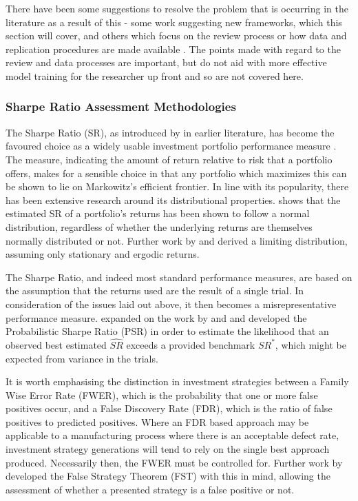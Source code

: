\documentclass[a4paper,11pt,oneside]{article}
\theoremstyle{plain}
\theoremstyle{definition}
\begin{document}
	There have been some suggestions to resolve the problem that is occurring in the literature as a result of this - some 
	work suggesting new frameworks, which this section will cover, and others which focus on the review process or 
	how data and replication procedures are made available \citep{Prado}. The points made with regard to the review and data processes are important, 
	but do not aid with more effective model training for the researcher up front and so are not covered here.
	
	\subsubsection{Sharpe Ratio Assessment Methodologies}\label{lr_backtest_sr}
	
	
	The Sharpe Ratio (SR), as introduced by \citet{Sharpe} in earlier literature, has become the favoured choice as a widely usable
	investment portfolio performance measure \citep{BaileyFrontier}. The measure, indicating the amount of return relative to risk that a portfolio offers, makes for 
	a sensible choice in that any portfolio which maximizes this can be shown to lie on Markowitz's efficient frontier. In line with its popularity, there has been 
	extensive research around its distributional properties. \citet{Lo} shows that the estimated SR of a portfolio's returns has been shown to follow a normal distribution, regardless
	of whether the underlying returns are themselves normally distributed or not. Further work by \citet{Christie} and \citet{Opdyke} derived a limiting distribution, assuming only stationary and ergodic returns.
		\hfill \break 
		
	The Sharpe Ratio, and indeed most standard performance measures, are based on the assumption that the returns used are the result of a single trial. In consideration of the issues laid out above, it then becomes a misrepresentative performance measure. \citet{BaileyFrontier} expanded on the work by \citet{Christie} and \citet{Opdyke} and developed the Probabilistic Sharpe Ratio (PSR) in order to estimate the likelihood that an observed best estimated $\widehat{SR}$ exceeds a provided benchmark $SR^{*}$, which might be expected from variance in the trials. 
	\hfill \break 
	
	It is worth emphasising the distinction in investment strategies between a Family Wise Error Rate (FWER), which is the  probability that one or more false positives occur, and a False Discovery Rate (FDR), which is the ratio of false positives to predicted positives. Where an FDR based approach may be applicable to a manufacturing process where there is an acceptable defect rate, investment strategy generations will tend to rely on the single best approach produced. Necessarily then, the FWER must be controlled for. Further work by \citet{BaileySharpe} developed the False Strategy Theorem (FST) with this in mind, allowing the assessment of whether a presented strategy is a false positive or not.
		\hfill \break 
	
\end{document}
